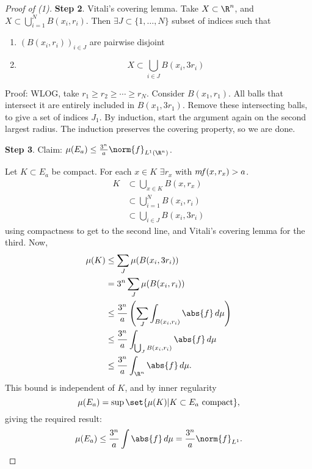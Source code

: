 \documentclass{article}
\begin{document}
\begin{proof}[Proof of (1)]
    \textbf{Step 2}. Vitali's covering lemma.
    Take $X \subset \R^n$, and $X \subset \bigcup_{i=1}^N B(x_i, r_i)$.  Then $\exists J \subset \{1, \dotsc, N\}$ subset of indices such that
    \begin{enumerate}[label=(\alph*)]
        \item $(B(x_i, r_i))_{i \in J}$ are pairwise disjoint
        \item
            \begin{equation*}
                X \subset \bigcup_{i \in J} B(x_i, 3 r_i)
            \end{equation*}
    \end{enumerate}
    Proof: WLOG, take $r_1 \geq r_2 \geq \dotsb \geq r_N$. Consider $B(x_1, r_1)$. All balls that intersect it are entirely included in $B(x_1, 3 r_1)$. %
    Remove these intersecting balls, to give a set of indices $J_1$. By induction, start the argument again on the second largest radius.
    The induction preserves the covering property, so we are done.

    \textbf{Step 3}. Claim: $\mu(E_a) \leq \frac{3^n}{a} \norm{f}_{L^1(\R^n)}$.

    Let $K \subset E_a$ be compact.
    For each $x \in K$ $\exists r_x$ with $m \! f(x, r_x) > a$.
    \begin{align*}
        K &\subset \bigcup_{x \in K} B(x, r_x) \\
          &\subset \bigcup_{i=1}^N B(x_i, r_i) \\
          &\subset \bigcup_{i \in J} B(x_i, 3 r_i)
    \end{align*}
    using compactness to get to the second line, and Vitali's covering lemma for the third. Now,
    \begin{align*}
        \mu(K) &\leq \sum_J \mu(B(x_i, 3 r_i)) \\
               &= 3^n \sum_J \mu(B(x_i, r_i)) \\
               &\leq \frac{3^n}{a} \left(\sum_J \int_{B(x_i, r_i)} \abs{f} \, d\mu\right) \\
               &\leq \frac{3^n}{a} \int_{\bigcup_J B(x_i, r_i)} \abs{f} \, d\mu \\
               &\leq \frac{3^n}{a} \int_{\R^n} \abs{f} \, d\mu.
    \end{align*}
    This bound is independent of $K$, and by inner regularity \begin{equation*}\mu(E_a) = \sup\set{\mu(K) | K \subset E_a \text{ compact}},\end{equation*} giving the required result:
    \begin{equation*}
        \mu(E_a) \leq \frac{3^n}{a} \int \abs{f} \, d\mu = \frac{3^n}{a} \norm{f}_{L^1}.
    \end{equation*}


\end{proof}
\end{document}
